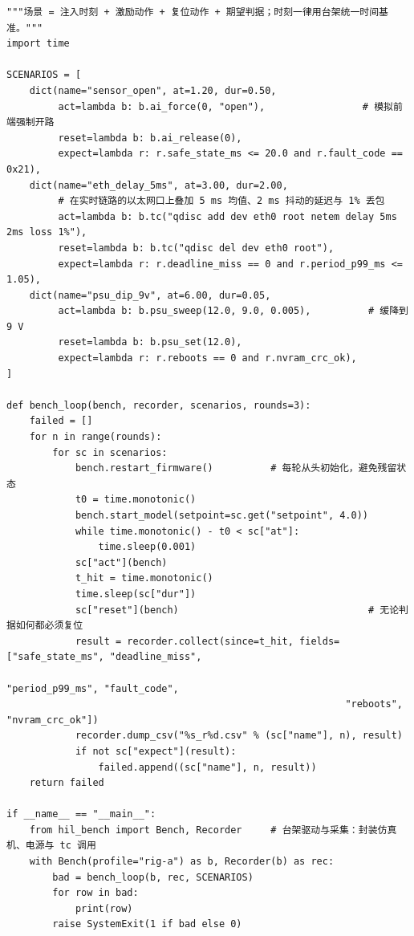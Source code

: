 \documentclass[12pt,a4paper,fontset=fandol]{ctexbook}
\begin{document}
\begin{lstlisting}[style=pythonstyle,caption={Python：HIL 台架的故障注入调度脚本（传感器失效、总线延迟、电源跌落三类场景编排）},label={lst:ch14-hil}]
"""场景 = 注入时刻 + 激励动作 + 复位动作 + 期望判据；时刻一律用台架统一时间基准。"""
import time

SCENARIOS = [
    dict(name="sensor_open", at=1.20, dur=0.50,
         act=lambda b: b.ai_force(0, "open"),                 # 模拟前端强制开路
         reset=lambda b: b.ai_release(0),
         expect=lambda r: r.safe_state_ms <= 20.0 and r.fault_code == 0x21),
    dict(name="eth_delay_5ms", at=3.00, dur=2.00,
         # 在实时链路的以太网口上叠加 5 ms 均值、2 ms 抖动的延迟与 1% 丢包
         act=lambda b: b.tc("qdisc add dev eth0 root netem delay 5ms 2ms loss 1%"),
         reset=lambda b: b.tc("qdisc del dev eth0 root"),
         expect=lambda r: r.deadline_miss == 0 and r.period_p99_ms <= 1.05),
    dict(name="psu_dip_9v", at=6.00, dur=0.05,
         act=lambda b: b.psu_sweep(12.0, 9.0, 0.005),          # 缓降到 9 V
         reset=lambda b: b.psu_set(12.0),
         expect=lambda r: r.reboots == 0 and r.nvram_crc_ok),
]

def bench_loop(bench, recorder, scenarios, rounds=3):
    failed = []
    for n in range(rounds):
        for sc in scenarios:
            bench.restart_firmware()          # 每轮从头初始化，避免残留状态
            t0 = time.monotonic()
            bench.start_model(setpoint=sc.get("setpoint", 4.0))
            while time.monotonic() - t0 < sc["at"]:
                time.sleep(0.001)
            sc["act"](bench)
            t_hit = time.monotonic()
            time.sleep(sc["dur"])
            sc["reset"](bench)                                 # 无论判据如何都必须复位
            result = recorder.collect(since=t_hit, fields=["safe_state_ms", "deadline_miss",
                                                           "period_p99_ms", "fault_code",
                                                           "reboots", "nvram_crc_ok"])
            recorder.dump_csv("%s_r%d.csv" % (sc["name"], n), result)
            if not sc["expect"](result):
                failed.append((sc["name"], n, result))
    return failed

if __name__ == "__main__":
    from hil_bench import Bench, Recorder     # 台架驱动与采集：封装仿真机、电源与 tc 调用
    with Bench(profile="rig-a") as b, Recorder(b) as rec:
        bad = bench_loop(b, rec, SCENARIOS)
        for row in bad:
            print(row)
        raise SystemExit(1 if bad else 0)
\end{lstlisting}
\end{document}
